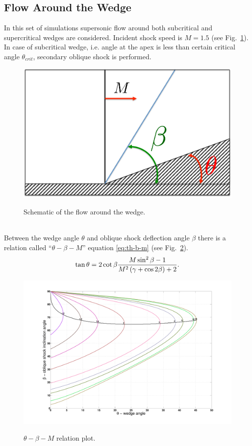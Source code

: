 \subsection{Flow Around the Wedge}
In this set of simulations supersonic flow around both subcritical and supercritical wedges are considered. Incident shock speed is $M = 1.5$ (see Fig.~\ref{fig:wedge_scheme}). In case of subcritical wedge, i.e. angle at the apex is less than certain critical angle $\theta_{crit}$, secondary oblique shock is performed. 
\begin{figure}[h!]
\centering \includegraphics[scale=0.6]{fig/wedge_scheme.pdf}\\
\caption{Schematic of the flow around the wedge. \label{fig:wedge_scheme}}
\end{figure}\\
Between the wedge angle $\theta$ and oblique shock deflection angle $\beta$ there is a relation called ``$\theta-\beta-M$'' equation \eqref{eq:th-b-m} (see Fig.~\ref{fig:th-b-m}).
\begin{align}
\tan \theta = 2 \cot \beta \frac {M \sin^2 \beta - 1}{M^2 \left(\gamma + \cos 2 \beta\right) + 2}. \label{eq:th-b-m}
\end{align}
\begin{figure}[h!]
\centering \includegraphics[scale=0.2]{fig/th-b-m.pdf}\\
\caption{$\theta-\beta-M$ relation plot. \label{fig:th-b-m}}
\end{figure}\\
